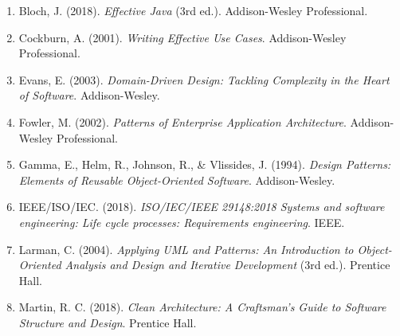 \documentclass[a4paper,12pt]{report}
\providecommand{\tightlist}{%
  \setlength{\itemsep}{0pt}\setlength{\parskip}{0pt}}
\begin{document}
\begin{enumerate}
\def\labelenumi{\arabic{enumi}.}
\tightlist
\item
  Bloch, J. (2018). \emph{Effective Java} (3rd ed.). Addison-Wesley
  Professional.
\item
  Cockburn, A. (2001). \emph{Writing Effective Use Cases}.
  Addison-Wesley Professional.
\item
  Evans, E. (2003). \emph{Domain-Driven Design: Tackling Complexity in
  the Heart of Software}. Addison-Wesley.
\item
  Fowler, M. (2002). \emph{Patterns of Enterprise Application
  Architecture}. Addison-Wesley Professional.
\item
  Gamma, E., Helm, R., Johnson, R., \& Vlissides, J. (1994).
  \emph{Design Patterns: Elements of Reusable Object-Oriented Software}.
  Addison-Wesley.
\item
  IEEE/ISO/IEC. (2018). \emph{ISO/IEC/IEEE 29148:2018 Systems and
  software engineering: Life cycle processes: Requirements engineering}.
  IEEE.
\item
  Larman, C. (2004). \emph{Applying UML and Patterns: An Introduction to
  Object-Oriented Analysis and Design and Iterative Development} (3rd
  ed.). Prentice Hall.
\item
  Martin, R. C. (2018). \emph{Clean Architecture: A Craftsman's Guide to
  Software Structure and Design}. Prentice Hall.
\end{enumerate}
\end{document}
